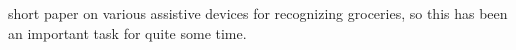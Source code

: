 \cite{lanigan2006trinetra} short paper on various assistive devices for recognizing groceries, so this has been an important task for quite some time. 

